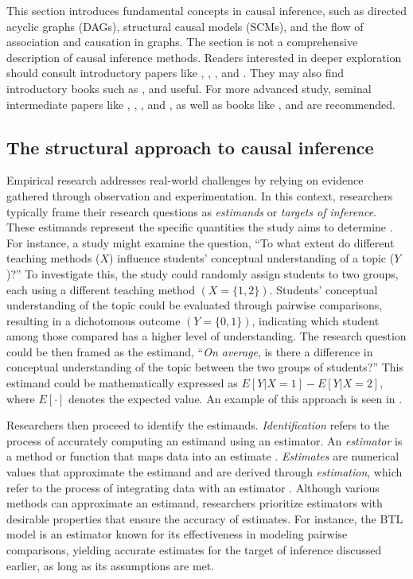 \documentclass[
  authoryear,
  preprint,
  1p]{elsarticle}
\begin{document}
This section introduces fundamental concepts in causal inference, such
as directed acyclic graphs (DAGs), structural causal models (SCMs), and
the flow of association and causation in graphs. The section is not a
comprehensive description of causal inference methods. Readers
interested in deeper exploration should consult introductory papers like
\citet{Pearl_2010}, \citet{Rohrer_2018}, \citet{Pearl_2019}, and
\citet{Cinelli_et_al_2020}. They may also find introductory books such
as \citet{Pearl_et_al_2018}, \citet{Neal_2020} and
\citet{McElreath_2020} useful. For more advanced study, seminal
intermediate papers like \citet{Neyman_et_al_1923}, \citet{Rubin_1974},
\citet{Spirtes_et_al_1991}, and \citet{Sekhon_2009}, as well as books
like \citet{Pearl_2009}, \citet{Morgan_et_al_2014} and
\citet{Hernan_et_al_2020} are recommended.

\subsection{The structural approach to causal
inference}\label{sec-framework-structural}

Empirical research addresses real-world challenges by relying on
evidence gathered through observation and experimentation. In this
context, researchers typically frame their research questions as
\emph{estimands} or \emph{targets of inference}. These estimands
represent the specific quantities the study aims to determine
\citep{Everitt_et_al_2010}. For instance, a study might examine the
question, ``To what extent do different teaching methods (\(X\))
influence students' conceptual understanding of a topic (\(Y\))?'' To
investigate this, the study could randomly assign students to two
groups, each using a different teaching method \((X=\{1,2\})\).
Students' conceptual understanding of the topic could be evaluated
through pairwise comparisons, resulting in a dichotomous outcome
\((Y=\{0,1\})\), indicating which student among those compared has a
higher level of understanding. The research question could be then
framed as the estimand, ``\emph{On average}, is there a difference in
conceptual understanding of the topic between the two groups of
students?'' This estimand could be mathematically expressed as
\(E[Y| X=1] - E[Y| X=2]\), where \(E[\cdot]\) denotes the expected
value. An example of this approach is seen in \citet{Jones_et_al_2019}.

Researchers then proceed to identify the estimands.
\emph{Identification} refers to the process of accurately computing an
estimand using an estimator. An \emph{estimator} is a method or function
that maps data into an estimate \citep{Neal_2020}. \emph{Estimates} are
numerical values that approximate the estimand and are derived through
\emph{estimation}, which refer to the process of integrating data with
an estimator \citep{Everitt_et_al_2010}. Although various methods can
approximate an estimand, researchers prioritize estimators with
desirable properties that ensure the accuracy of estimates. For
instance, the BTL model \citep{Bradley_et_al_1952, Luce_1959} is an
estimator known for its effectiveness in modeling pairwise comparisons,
yielding accurate estimates for the target of inference discussed
earlier, as long as its assumptions are met.
\end{document}
